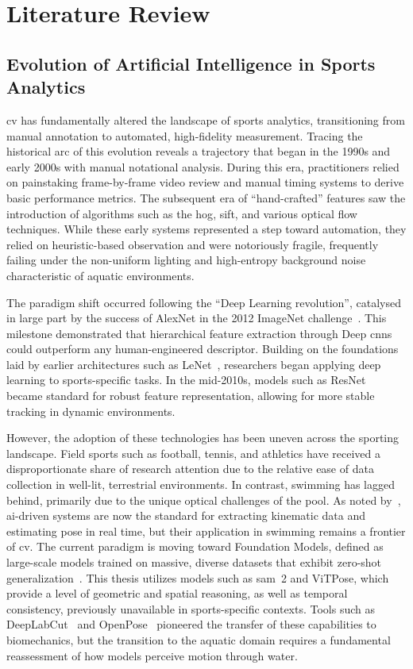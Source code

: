 \chapter{Literature Review}%
\label{chp:literature_review}

\section{Evolution of Artificial Intelligence in Sports Analytics}
\gls{cv} has fundamentally altered the landscape of sports analytics, transitioning
from manual annotation to automated, high-fidelity measurement. Tracing the historical arc of
this evolution reveals a trajectory that began in the 1990s and early 2000s with manual
notational analysis. During this era, practitioners relied on painstaking frame-by-frame video
review and manual timing systems to derive basic performance metrics. The subsequent era of
``hand-crafted'' features saw the introduction of algorithms such as the \gls{hog}, \gls{sift}, and various optical flow techniques.
While these early systems represented a step toward automation, they relied on heuristic-based
observation and were notoriously fragile, frequently failing under the non-uniform lighting and
high-entropy background noise characteristic of aquatic environments.

The paradigm shift occurred following the ``Deep Learning revolution'', catalysed in large part
by the success of AlexNet in the 2012 ImageNet challenge~\cite{krizhevsky2012imagenet}. This
milestone demonstrated that hierarchical feature extraction through Deep \gls{cnn}s could outperform any human-engineered descriptor. Building on the foundations
laid by earlier architectures such as LeNet~\cite{lecun2002gradient}, researchers began applying
deep learning to sports-specific tasks. In the mid-2010s, models such as
ResNet~\cite{he2016deep} became standard for robust feature representation, allowing for more
stable tracking in dynamic environments.

However, the adoption of these technologies has been uneven across the sporting landscape. Field
sports such as football, tennis, and athletics have received a disproportionate share of research
attention due to the relative ease of data collection in well-lit, terrestrial environments. In
contrast, swimming has lagged behind, primarily due to the unique optical challenges of the pool.
As noted by~\cite{Zhou2025}, \gls{ai}-driven systems are now the standard for extracting kinematic
data and estimating pose in real time, but their application in swimming remains a frontier of
\gls{cv}. The current paradigm is moving toward Foundation Models, defined as large-scale
models trained on massive, diverse datasets that exhibit zero-shot
generalization~\cite{dosovitskiy2020image}. This thesis utilizes models such as \gls{sam}~2 and
ViTPose, which provide a level of geometric and spatial reasoning, as well as temporal
consistency, previously unavailable in sports-specific contexts. Tools such as
DeepLabCut~\cite{mathis2018deeplabcut} and OpenPose~\cite{cao2019openpose} pioneered the
transfer of these capabilities to biomechanics, but the transition to the aquatic domain requires
a fundamental reassessment of how models perceive motion through water.

